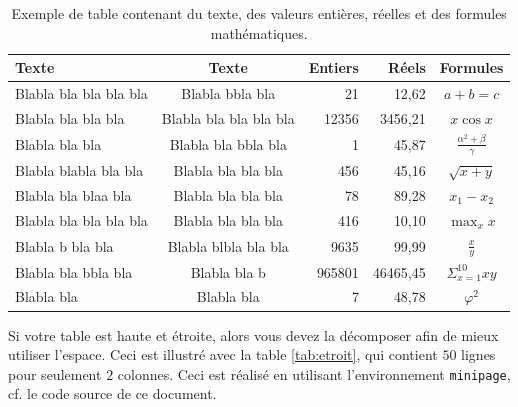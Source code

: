 \documentclass{ceri}
\begin{document}
\begin{table}[htb]
	\centering
	\begin{tabular}{l c r r c}
		\hline
		\rowcolor{DarkColor} 
		\textbf{Texte} 			& \textbf{Texte}			& \textbf{Entiers}	& \textbf{Réels}	& \textbf{Formules}	\\ 
		\hline
		Blabla bla bla bla bla	& Blabla bbla bla			& 21 				& 12,62				& $a+b=c$								\\
		Blabla bla bla bla		& Blabla bla bla bla bla	& 12356 			& 3456,21			& $x\cos{x}$							\\
		Blabla bla bla			& Blabla bla bbla bla		& 1 				& 45,87				& $\frac{\alpha^{2}+\beta}{\gamma}$	\\
		Blabla blabla bla bla	& Blabla bla bla bla		& 456 				& 45,16				& $\sqrt{x+y}$	\\
		Blabla bla blaa bla		& Blabla bla bla bla		& 78 				& 89,28				& $x_{1}-x_{2}$	\\
		Blabla bla bla bla bla	& Blabla bla bla bla		& 416 				& 10,10				& $\max_{x}{x}$	\\
		Blabla b bla bla		& Blabla blbla bla bla		& 9635 				& 99,99				& $\frac{x}{y}$	\\
		Blabla bla bbla bla		& Blabla bla b				& 965801 			& 46465,45			& $\Sigma_{x=1}^{10}{xy}$	\\
		Blabla bla				& Blabla bla				& 7 				& 48,78				& $\varphi^2$	\\
		\hline
	\end{tabular}
	\caption{Exemple de table contenant du texte, des valeurs entières, réelles et des formules mathématiques.}
	\label{tab:exemple}
\end{table}

Si votre table est haute et étroite, alors vous devez la décomposer afin de mieux utiliser l'espace. Ceci est illustré avec la table \ref{tab:etroit}, qui contient $50$ lignes pour seulement $2$ colonnes. Ceci est réalisé en utilisant l'environnement \texttt{minipage}, cf. le code source de ce document.
	
\end{document}
